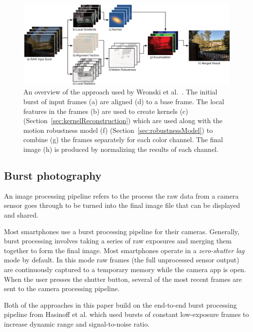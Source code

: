 \documentclass{sig-alternate}
\begin{document}
\begin{figure}[t]
\centering
\includegraphics[width=42pc]{Wronski2019-figure-2}
\caption{An overview of the approach used by Wronski et al.~\cite{Wronski2019}. The initial burst of input frames (a) are aligned (d) to a base frame. The local features in the frames (b) are used to create kernels (c) (Section~\ref{sec:kernelReconstruction}) which are used along with the motion robustness model (f) (Section~\ref{sec:robustnessModel}) to combine (g) the frames separately for each color channel. The final image (h) is produced by normalizing the results of each channel.}
\label{fig:Wronski2019Fig2}
\end{figure}

\pagebreak

\subsection{Burst photography}
\label{sec:background:burstPhotography}

An image processing pipeline refers to the process the raw data from a camera sensor goes through to be turned into the final image file that can be displayed and shared. 

Most smartphones use a burst processing pipeline for their cameras. Generally, burst processing involves taking a series of raw exposures and merging them together to form the final image. Most smartphones operate in a \emph{zero-shutter lag} mode by default. In this mode raw frames (the full unprocessed sensor output) are continuously captured to a temporary memory while the camera app is open. When the user presses the shutter button, several of the most recent frames are sent to the camera processing pipeline.

Both of the approaches in this paper build on the end-to-end burst processing pipeline from Hasinoff et al. \cite{Hasinoff2016} which used bursts of constant low-exposure frames to increase dynamic range and signal-to-noise ratio.
\end{document}
